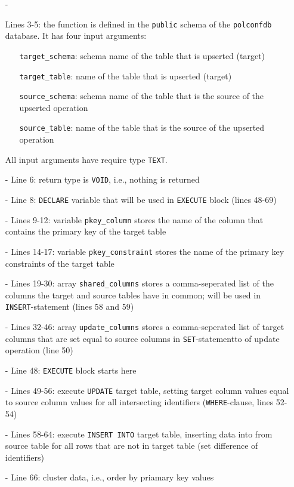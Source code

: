 \begin{itemize}
\item[-]{Lines 3-5: 
the function is defined in the \texttt{public} schema of the \texttt{polconfdb} database.
It has four input arguments:
  \begin{itemize}
  \item[]{\texttt{target\_schema}: schema name of the table that is upserted (target)}
  \item[]{\texttt{target\_table}: name of the table that is upserted (target)}
  \item[]{\texttt{source\_schema}: schema name of the table that is the source of the upserted operation}
  \item[]{\texttt{source\_table}: name of the table that is the source of the upserted operation}
  \end{itemize}
All input arguments have require type \texttt{TEXT}.
}
\item[-]{Line 6: return type is \texttt{VOID}, i.e., nothing is returned}
\item[-]{Line 8: \texttt{DECLARE} variable that will be used in \texttt{EXECUTE} block (lines 48-69)}
\item[-]{Lines 9-12: variable \texttt{pkey\_column} stores the name of the column that contains the primary key of the target table}
\item[-]{Lines 14-17: variable \texttt{pkey\_constraint} stores the name of the primary key constraints of the target table}
\item[-]{Lines 19-30: array \texttt{shared\_columns} stores a comma-seperated list of the columns the target and source tables have in common; will be used in \texttt{INSERT}-statement (lines 58 and 59)}
\item[-]{Lines 32-46: array \texttt{update\_columns} stores a comma-seperated list of target columns that are set equal to source columns in \texttt{SET}-statementto of update operation (line 50)}
\item[-]{Line 48: \texttt{EXECUTE} block starts here}
\item[-]{Lines 49-56: execute \texttt{UPDATE} target table, setting target column values equal to source column values for all intersecting identifiers (\texttt{WHERE}-clause, lines 52-54)}
\item[-]{Lines 58-64: execute \texttt{INSERT INTO} target table, inserting data into from source table for all rows that are not in target table (set difference of identifiers)}
\item[-]{Line 66: cluster data, i.e., order by priamary key values}
\end{itemize}

